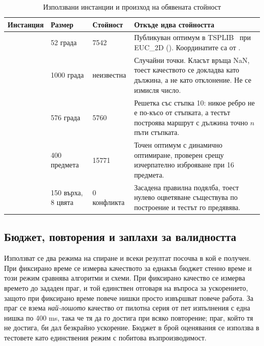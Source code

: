 \begin{table}[htbp]
\centering
\renewcommand{\arraystretch}{0.9}
\caption{Използвани инстанции и произход на обявената стойност}
\label{tab:instances}
\begin{adjustbox}{max width=\textwidth}
\begin{tabular}{@{}L{3.0cm}L{1.7cm}L{1.7cm}L{7.2cm}@{}}
\toprule
\textbf{Инстанция} & \textbf{Размер} & \textbf{Стойност} & \textbf{Откъде идва стойността} \\
\midrule
{} & 52 града & 7542 & Публикуван оптимум в TSPLIB~\cite{reinelt1991tsplib} при EUC\_2D (). Координатите са от . \\
 & 1000 града & неизвестна & Случайни точки. Класът връща NaN, тоест качеството се докладва като дължина, а не като отклонение. Не се измисля число. \\
 & 576 града & 5760 & Решетка със стъпка 10: никое ребро не е по-късо от стъпката, а тестът построява маршрут с дължина точно $n$ пъти стъпката. \\
 & 400 предмета & 15771 & Точен оптимум с динамично оптимиране, проверен срещу изчерпателно изброяване при 16 предмета. \\
 & 150 върха, 8 цвята & 0 конфликта & Засадена правилна подялба, тоест нулево оцветяване съществува по построение и тестът го предявява. \\
\bottomrule
\end{tabular}
\end{adjustbox}
\end{table}

\subsection{Бюджет, повторения и заплахи за валидността}
\label{subsec:method-profiling}

Използват се два режима на спиране и всеки резултат посочва в кой е получен. При фиксирано време се
измерва качеството за еднакъв бюджет стенно време и този режим сравнява алгоритми и схеми. При
фиксирано качество се измерва времето до зададен праг, и той единствен отговаря на въпроса за
ускорението, защото при фиксирано време повече нишки просто извършват повече работа. За праг се взема
\emph{най-лошото} качество от пилотна серия от пет изпълнения с една нишка по 400 ms, така че тя да го
достига при всяко повторение; праг, който тя не достига, би дал безкрайно ускорение. Бюджет в брой
оценявания се използва в тестовете като единствения режим с побитова възпроизводимост.

